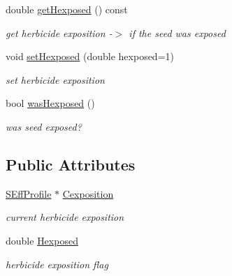 \begin{DoxyCompactItemize}
\mbox{\label{class_c_t_d_seed_ac7360b069cae2fffcf17c0b7b1f482cd}} 
double \mbox{\hyperlink{class_c_t_d_seed_ac7360b069cae2fffcf17c0b7b1f482cd}{get\+Hexposed}} () const
\begin{DoxyCompactList}\small\item\em get herbicide exposition -\/$>$ if the seed was exposed \end{DoxyCompactList}\item 
void \mbox{\hyperlink{class_c_t_d_seed_a8f9ec854146a44f5921cbc8a361c0b1e}{set\+Hexposed}} (double hexposed=1)
\begin{DoxyCompactList}\small\item\em set herbicide exposition \end{DoxyCompactList}\item 
\mbox{\label{class_c_t_d_seed_a18357a43ccce34ed0fe7360455902352}} 
bool \mbox{\hyperlink{class_c_t_d_seed_a18357a43ccce34ed0fe7360455902352}{was\+Hexposed}} ()
\begin{DoxyCompactList}\small\item\em was seed exposed? \end{DoxyCompactList}\end{DoxyCompactItemize}
\subsection*{Public Attributes}
\begin{DoxyCompactItemize}
\item 
\mbox{\label{class_c_t_d_seed_a409c71778006fd90fde48fcb9a6ae287}} 
\mbox{\hyperlink{struct_s_eff_profile}{S\+Eff\+Profile}} $\ast$ \mbox{\hyperlink{class_c_t_d_seed_a409c71778006fd90fde48fcb9a6ae287}{Cexposition}}
\begin{DoxyCompactList}\small\item\em current herbicide exposition \end{DoxyCompactList}\item 
\mbox{\label{class_c_t_d_seed_ab1e3207c5f88dc7fafc8a3fbcbcc1e70}} 
double \mbox{\hyperlink{class_c_t_d_seed_ab1e3207c5f88dc7fafc8a3fbcbcc1e70}{Hexposed}}
\begin{DoxyCompactList}\small\item\em herbicide exposition flag \end{DoxyCompactList}\end{DoxyCompactItemize}

